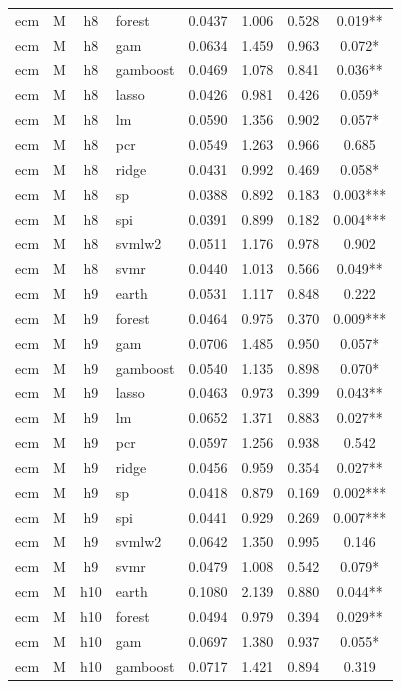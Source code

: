\begin{ThreePartTable}
\begin{longtable}[t]{llclcccc}
ecm & M & h8 & forest & 0.0437 & 1.006 & 0.528 & 0.019**\\
ecm & M & h8 & gam & 0.0634 & 1.459 & 0.963 & 0.072*\\
ecm & M & h8 & gamboost & 0.0469 & 1.078 & 0.841 & 0.036**\\
ecm & M & h8 & lasso & 0.0426 & 0.981 & 0.426 & 0.059*\\
ecm & M & h8 & lm & 0.0590 & 1.356 & 0.902 & 0.057*\\
ecm & M & h8 & pcr & 0.0549 & 1.263 & 0.966 & 0.685\\
ecm & M & h8 & ridge & 0.0431 & 0.992 & 0.469 & 0.058*\\
ecm & M & h8 & sp & 0.0388 & 0.892 & 0.183 & 0.003***\\
ecm & M & h8 & spi & 0.0391 & 0.899 & 0.182 & 0.004***\\
ecm & M & h8 & svmlw2 & 0.0511 & 1.176 & 0.978 & 0.902\\
ecm & M & h8 & svmr & 0.0440 & 1.013 & 0.566 & 0.049**\\
\addlinespace
ecm & M & h9 & earth & 0.0531 & 1.117 & 0.848 & 0.222\\
ecm & M & h9 & forest & 0.0464 & 0.975 & 0.370 & 0.009***\\
ecm & M & h9 & gam & 0.0706 & 1.485 & 0.950 & 0.057*\\
ecm & M & h9 & gamboost & 0.0540 & 1.135 & 0.898 & 0.070*\\
ecm & M & h9 & lasso & 0.0463 & 0.973 & 0.399 & 0.043**\\
ecm & M & h9 & lm & 0.0652 & 1.371 & 0.883 & 0.027**\\
ecm & M & h9 & pcr & 0.0597 & 1.256 & 0.938 & 0.542\\
ecm & M & h9 & ridge & 0.0456 & 0.959 & 0.354 & 0.027**\\
ecm & M & h9 & sp & 0.0418 & 0.879 & 0.169 & 0.002***\\
ecm & M & h9 & spi & 0.0441 & 0.929 & 0.269 & 0.007***\\
ecm & M & h9 & svmlw2 & 0.0642 & 1.350 & 0.995 & 0.146\\
ecm & M & h9 & svmr & 0.0479 & 1.008 & 0.542 & 0.079*\\
\addlinespace
ecm & M & h10 & earth & 0.1080 & 2.139 & 0.880 & 0.044**\\
ecm & M & h10 & forest & 0.0494 & 0.979 & 0.394 & 0.029**\\
ecm & M & h10 & gam & 0.0697 & 1.380 & 0.937 & 0.055*\\
ecm & M & h10 & gamboost & 0.0717 & 1.421 & 0.894 & 0.319\\

\end{longtable}
\end{ThreePartTable}
